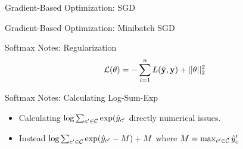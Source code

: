 \documentclass{beamer}
\begin{document}
\begin{frame}{Gradient-Based Optimization: SGD}
  \begin{figure}
    \begin{algorithmic}
      \EndWhile{}
      \State{\Return{$\theta$}}
      \EndProcedure{}
    \end{algorithmic}
  \end{figure}
\end{frame}


\begin{frame}{Gradient-Based Optimization: Minibatch SGD}
  \begin{figure}
    \begin{algorithmic}
      \EndFor{}
      \EndWhile{}
      \State{\Return{$\theta$}}
    \end{algorithmic}
  \end{figure}

\end{frame}

\begin{frame}{Softmax Notes: Regularization}
  \[ \mathcal{L}(\theta) = - \sum_{i=1}^n L(\hat{\mathbf{y}}, \mathbf{y}) + ||\theta||^2_2\] 
\end{frame}

\begin{frame}{Softmax Notes: Calculating Log-Sum-Exp}
  \begin{itemize}
  \item Calculating $\log \sum_{c' \in \mathcal{C}} \exp(\hat{y}_{c'}$ directly numerical issues.
  \item Instead $\log \sum_{c' \in \mathcal{C}} \exp(\hat{y}_{c'} - M) + M$ where $M = \max_{c'\in\mathcal{C}} \hat{y}_c'$ 
  \end{itemize}
\end{frame}
\end{document}
